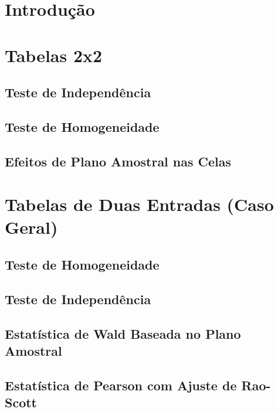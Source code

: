 \documentclass[]{book}
\theoremstyle{definition}
\theoremstyle{definition}
\theoremstyle{definition}
\theoremstyle{remark}
\begin{document}
\section{Introdução}\label{introducao-2}

\section{Tabelas 2x2}\label{tabelas22}

\subsection{Teste de Independência}\label{teste-de-independencia}

\subsection{Teste de Homogeneidade}\label{teste-de-homogeneidade}

\subsection{Efeitos de Plano Amostral nas
Celas}\label{efeitos-de-plano-amostral-nas-celas}

\section{Tabelas de Duas Entradas (Caso
Geral)}\label{tabelas-de-duas-entradas-caso-geral}

\subsection{Teste de Homogeneidade}\label{teste-de-homogeneidade-1}

\subsection{Teste de Independência}\label{teste-de-independencia-1}

\subsection{Estatística de Wald Baseada no Plano
Amostral}\label{estatistica-de-wald-baseada-no-plano-amostral-1}

\subsection{Estatística de Pearson com Ajuste de
Rao-Scott}\label{estatistica-de-pearson-com-ajuste-de-rao-scott}
\end{document}
